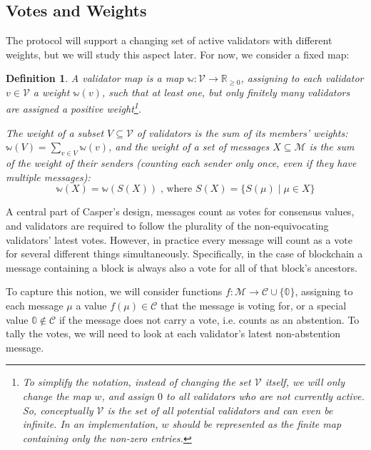 \documentclass[12pt, fleqn]{article}
\newtheorem{definition}{Definition}
\newcommand{\ww}{\mathbb{w}}
\begin{document}
\subsection{Votes and Weights}

The protocol will support a changing set of active validators with different weights, but we will study this aspect later. For now, we consider a fixed map:

\begin{definition}
  A \emph{validator map} is a map $\ww: \mathcal{V} \rightarrow \mathbb{R}_{\geq 0}$, assigning to each validator $v \in \mathcal{V}$ a \emph{weight} $\ww(v)$, such that at least one, but only finitely many validators are assigned a positive weight\footnote{To simplify the notation, instead of changing the set $\mathcal{V}$ itself, we will only change the map $w$, and assign $0$ to all validators who are not currently active. So, conceptually $\mathcal{V}$ is the set of all \emph{potential} validators and can even be infinite. In an implementation, $w$ should be represented as the finite map containing only the non-zero entries.}.

  The \emph{weight} of a subset $V \subseteq \mathcal{V}$ of validators is the sum of its members' weights: $\ww(V) = \sum_{v \in V} \ww(v)$, and the \emph{weight} of a set of messages $X \subseteq \mathcal{M}$ is the sum of the weight of their senders (counting each sender only once, even if they have multiple messages):
  $$\ww(X) = \ww(S(X)) \;\text{, where } S(X) = \{ S(\mu) \mid \mu \in X\}$$
\end{definition}

A central part of Casper's design,  messages count as votes for consensus values, and validators are required to follow the plurality of the non-equivocating validators' latest votes. However, in practice every message will count as a vote for several different things simultaneously. Specifically, in the case of blockchain a message containing a block is always also a vote for all of that block's ancestors.

To capture this notion, we will consider functions $f: \mathcal{M} \rightarrow \mathcal{C} \cup \{ \mathbb{0} \}$, assigning to each message $\mu$ a value $f(\mu) \in \mathcal{C}$ that the message is voting for, or a special value $\mathbb{0} \notin \mathcal{C}$ if the message does not carry a vote, i.e. counts as an abstention. To tally the votes, we will need to look at each validator's latest non-abstention message.
\end{document}
